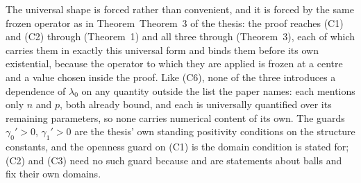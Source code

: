 \begin{theorem}[Theorem 4]
The universal shape is forced rather than convenient, and it is forced by the
same frozen operator as in Theorem~Theorem~3 of the thesis: the proof reaches (C1) and (C2)
through  (Theorem~1) and all three through
 (Theorem~3), each of which carries them in
exactly this universal form and binds them before its own existential, because
the operator to which they are applied is frozen at a centre and a value chosen
inside the proof.  Like (C6), none of the three introduces a dependence of
$\lambda_0$ on any quantity outside the list the paper names: each mentions only
$n$ and $p$, both already bound, and each is universally quantified over its
remaining parameters, so none carries numerical content of its own.  The guards
$\gamma_0'>0$, $\gamma_1'>0$ are the thesis' own standing positivity conditions
on the structure constants, and the openness guard on (C1) is the domain
condition  is stated for; (C2) and (C3) need no
such guard because  and
 are statements about balls and fix their own
domains.
\end{theorem}
